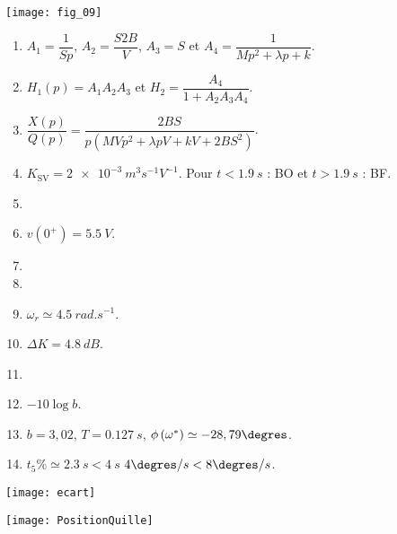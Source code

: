 \begin{multicols}{2}
\ifprof
\else
\begin{center}
\texttt{[image: fig\_09]}
\end{center}
\fi




\ifprof
\else
\footnotesize

\begin{enumerate}
\item $A_1=\dfrac{1}{Sp}$,  $A_2 = \dfrac{S2B}{V} $,  $A_3 = S$  et $A_4 = \dfrac{1}{Mp^2  +\lambda p  + k}$.
\item $H_1(p)=A_1  A_2A_3$ et $H_2 = \dfrac{A_4}{1+ A_2A_3A_4 }$.
\item $\dfrac{X(p)}{Q(p)}=\dfrac{2BS}{p\left(MVp^2  +\lambda pV  + kV+ 2BS^2\right) }$.
\item  $K_{\text{SV}} = \SI{2e-3}{m^3 s^{-1}V^{-1}}$. Pour $t<\SI{1,9}{s}$ : BO et  $t>\SI{1,9}{s}$ : BF.
\item 
\item $v(0^{+})=\SI{5,5}{V}$.
\item 
\item 
\item  $\omega_r \simeq \SI{4,5}{rad.s^{-1}}$.
\item $\Delta K = \SI{4,8}{dB}$.
\item 
\item $-10\log b$.
\item  $b=3,02$,  $T=\SI{0,127}{s}$,   $\phi\left(\omega^{*}\right) \simeq -28,79\degres $.
\item $t_5\%\simeq \SI{2,3}{s}<\SI{4}{s}$ $ 4 \degres/s< 8 \degres/s$.
\end{enumerate}
\normalsize
\fi

\ifprof
\else
\end{multicols}
\fi


\ifprof
\else


\begin{center}
\texttt{[image: ecart]}
\end{center}

\begin{center}
\texttt{[image: PositionQuille]}
\end{center}


\fi
%
%
%
%

